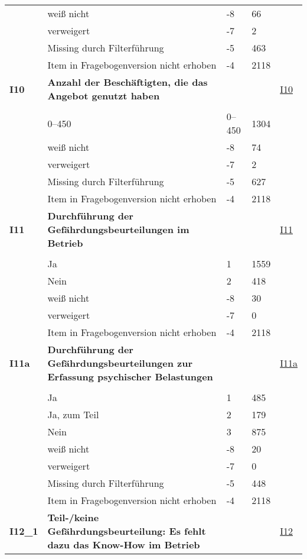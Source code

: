 \begin{longtable}{| L{2.5cm} | L{8.25cm}| C{1.5cm} | R{1.25cm} | C{2.25cm} |  }
   & weiß nicht & -8 & 66 &  \\ 
   & verweigert & -7 & 2 &  \\ 
   & Missing durch Filterführung & -5 & 463 &  \\ 
   & Item in Fragebogenversion nicht erhoben & -4 & 2118 &  \\ 
   \midrule
\textbf{I10}\label{var:suf:I10} & \textbf{Anzahl der Beschäftigten, die das Angebot genutzt haben} &  &  & \hyperref[I10]{I10} \\ 
   &  &  &  &  \\ 
   & 0--450 & 0--450 & 1304 &  \\ 
   & weiß nicht & -8 & 74 &  \\ 
   & verweigert & -7 & 2 &  \\ 
   & Missing durch Filterführung & -5 & 627 &  \\ 
   & Item in Fragebogenversion nicht erhoben & -4 & 2118 &  \\ 
   \midrule
\textbf{I11}\label{var:suf:I11} & \textbf{Durchführung der Gefährdungsbeurteilungen im Betrieb} &  &  & \hyperref[I11]{I11} \\ 
   &  &  &  &  \\ 
   & Ja & 1 & 1559 &  \\ 
   & Nein & 2 & 418 &  \\ 
   & weiß nicht & -8 & 30 &  \\ 
   & verweigert & -7 & 0 &  \\ 
   & Item in Fragebogenversion nicht erhoben & -4 & 2118 &  \\ 
   \midrule
\textbf{I11a}\label{var:suf:I11a} & \textbf{Durchführung der Gefährdungsbeurteilungen zur Erfassung psychischer Belastungen} &  &  & \hyperref[I11a]{I11a} \\ 
   &  &  &  &  \\ 
   & Ja & 1 & 485 &  \\ 
   & Ja, zum Teil & 2 & 179 &  \\ 
   & Nein & 3 & 875 &  \\ 
   & weiß nicht & -8 & 20 &  \\ 
   & verweigert & -7 & 0 &  \\ 
   & Missing durch Filterführung & -5 & 448 &  \\ 
   & Item in Fragebogenversion nicht erhoben & -4 & 2118 &  \\ 
   \midrule
\textbf{I12\_1}\label{var:suf:I12:1} & \textbf{Teil-/keine Gefährdungsbeurteilung: Es fehlt dazu das Know-How im Betrieb} &  &  & \hyperref[I12]{I12} \\ 

\end{longtable}

